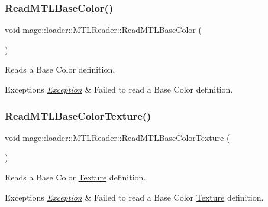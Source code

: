 \hypertarget{classmage_1_1loader_1_1_m_t_l_reader_a1baab97ace07be143d8cc26fac576bf6}{}\label{classmage_1_1loader_1_1_m_t_l_reader_a1baab97ace07be143d8cc26fac576bf6} 
\subsubsection{\texorpdfstring{Read\+M\+T\+L\+Base\+Color()}{ReadMTLBaseColor()}}
{\footnotesize\ttfamily void mage\+::loader\+::\+M\+T\+L\+Reader\+::\+Read\+M\+T\+L\+Base\+Color (\begin{DoxyParamCaption}{ }\end{DoxyParamCaption})\hspace{0.3cm}{\ttfamily [private]}}

Reads a Base Color definition.


\begin{DoxyExceptions}{Exceptions}
{\em \hyperlink{classmage_1_1_exception}{Exception}} & Failed to read a Base Color definition. \\
\hline
\end{DoxyExceptions}
\hypertarget{classmage_1_1loader_1_1_m_t_l_reader_ae6e311806f880ee98ff42f7631b79b4a}{}\label{classmage_1_1loader_1_1_m_t_l_reader_ae6e311806f880ee98ff42f7631b79b4a} 
\subsubsection{\texorpdfstring{Read\+M\+T\+L\+Base\+Color\+Texture()}{ReadMTLBaseColorTexture()}}
{\footnotesize\ttfamily void mage\+::loader\+::\+M\+T\+L\+Reader\+::\+Read\+M\+T\+L\+Base\+Color\+Texture (\begin{DoxyParamCaption}{ }\end{DoxyParamCaption})\hspace{0.3cm}{\ttfamily [private]}}

Reads a Base Color \hyperlink{classmage_1_1_texture}{Texture} definition.


\begin{DoxyExceptions}{Exceptions}
{\em \hyperlink{classmage_1_1_exception}{Exception}} & Failed to read a Base Color \hyperlink{classmage_1_1_texture}{Texture} definition. \\
\hline
\end{DoxyExceptions}
\hypertarget{classmage_1_1loader_1_1_m_t_l_reader_adb3f407d3c72ea25e3a6dc917b880bbc}{}\label{classmage_1_1loader_1_1_m_t_l_reader_adb3f407d3c72ea25e3a6dc917b880bbc} 
